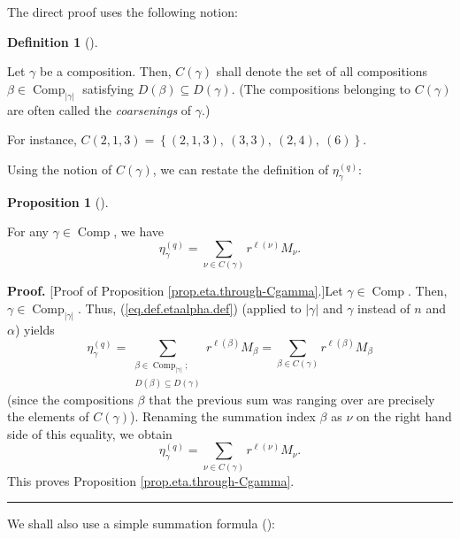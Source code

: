 \documentclass[numbers=enddot,12pt,final,onecolumn,notitlepage]{scrartcl}%
\theoremstyle{definition}
\newtheorem{prop}[theo]{Proposition}
\newenvironment{proposition}[1][]
{\begin{prop}[#1]\begin{leftbar}}
{\end{leftbar}\end{prop}}
\newtheorem{defi}[theo]{Definition}
\newenvironment{definition}[1][]
{\begin{defi}[#1]\begin{leftbar}}
{\end{leftbar}\end{defi}}
\newenvironment{proof}[1][Proof]{\noindent\textbf{#1.} }{\ \rule{0.5em}{0.5em}}
\let\sumnonlimits\sum
\renewcommand{\sum}{\sumnonlimits\limits}
\begin{document}
The direct proof uses the following notion:

\begin{definition}
Let $\gamma$ be a composition. Then, $C\left(  \gamma\right)  $ shall denote
the set of all compositions $\beta\in\operatorname*{Comp}\nolimits_{\left\vert
\gamma\right\vert }$ satisfying $D\left(  \beta\right)  \subseteq D\left(
\gamma\right)  $. (The compositions belonging to $C\left(  \gamma\right)  $
are often called the \emph{coarsenings} of $\gamma$.)
\end{definition}

For instance, $C\left(  2,1,3\right)  =\left\{  \left(  2,1,3\right)
,\ \left(  3,3\right)  ,\ \left(  2,4\right)  ,\ \left(  6\right)  \right\}  $.

Using the notion of $C\left(  \gamma\right)  $, we can restate the definition
of $\eta_{\gamma}^{\left(  q\right)  }$:

\begin{proposition}
\label{prop.eta.through-Cgamma}For any $\gamma\in\operatorname*{Comp}$, we
have%
\[
\eta_{\gamma}^{\left(  q\right)  }=\sum_{\nu\in C\left(  \gamma\right)
}r^{\ell\left(  \nu\right)  }M_{\nu}.
\]

\end{proposition}

\begin{proof}
[Proof of Proposition \ref{prop.eta.through-Cgamma}.]Let $\gamma
\in\operatorname*{Comp}$. Then, $\gamma\in\operatorname*{Comp}%
\nolimits_{\left\vert \gamma\right\vert }$. Thus, (\ref{eq.def.etaalpha.def})
(applied to $\left\vert \gamma\right\vert $ and $\gamma$ instead of $n$ and
$\alpha$) yields%
\[
\eta_{\gamma}^{\left(  q\right)  }=\sum_{\substack{\beta\in
\operatorname*{Comp}\nolimits_{\left\vert \gamma\right\vert };\\D\left(
\beta\right)  \subseteq D\left(  \gamma\right)  }}r^{\ell\left(  \beta\right)
}M_{\beta}=\sum_{\beta\in C\left(  \gamma\right)  }r^{\ell\left(
\beta\right)  }M_{\beta}%
\]
(since the compositions $\beta$ that the previous sum was ranging over are
precisely the elements of $C\left(  \gamma\right)  $). Renaming the summation
index $\beta$ as $\nu$ on the right hand side of this equality, we obtain%
\[
\eta_{\gamma}^{\left(  q\right)  }=\sum_{\nu\in C\left(  \gamma\right)
}r^{\ell\left(  \nu\right)  }M_{\nu}.
\]
This proves Proposition \ref{prop.eta.through-Cgamma}.
\end{proof}

We shall also use a simple summation formula (\cite[Proposition 5.17]{comps}):
\end{document}
